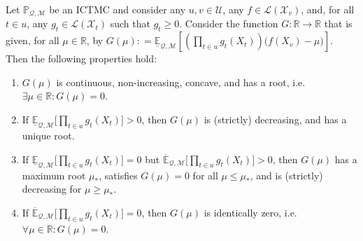 \documentclass[twoside,11pt]{article}
\makeatletter
\newcommand{\reals}{\mathbb{R}}
\newcommand{\states}{\mathcal{X}}
\newcommand{\lexp}{\underline{\mathbb{E}}_{\rateset,\mathcal{M}}}
\newcommand{\uexp}{\overline{\mathbb{E}}_{\rateset,\mathcal{M}}}
\newcommand{\gambles}{\mathcal{L}}
\newcommand{\rateset}{\mathcal{Q}}
\newcommand{\coloneqq}{:\!=}
\newcommand{\customlabel}[2]{%
   \protected@write \@auxout {}{\string \newlabel {#1}{{#2}{\thepage}{#2}{#1}{}} }%
   \hypertarget{#1}{\emph{#2}\!}
}
\makeatother
\begin{document}
\begin{proposition}\label{prop:GBR_properties}
Let $\mathbb{P}_{\rateset,\mathcal{M}}$ be an ICTMC and consider any $u,v\in\mathcal{U}$, any $f\in\gambles(\states_v)$, and, for all $t\in u$, any $g_{t}\in\gambles(\states_{t})$ such that $g_{t}\geq 0$. 
Consider the function $G: \reals\to\reals$ that is given, for all $\mu\in\reals$, by $G(\mu)\coloneqq \lexp\left[\left(\prod_{t\in u} g_{t}(X_{t})\right)\bigl(f(X_v) - \mu\bigr)\right]$.
%
%
%
Then the following properties hold: 
\begin{enumerate}[label=G\arabic*:,ref=G\arabic*]
\item $G(\mu)$ is continuous, non-increasing, concave, and has a root, i.e. $\exists \mu\in\reals:G(\mu)=0$. \label{GBR:always}
\item If $\lexp\bigl[\prod_{t\in u} g_{t}(X_{t})\bigr] >0$, then $G(\mu)$ is (strictly) decreasing, and has a unique root. \label{GBR:low_pos}
\item If $\lexp\bigl[\prod_{t\in u} g_{t}(X_{t})\bigr]=0$ but $\uexp\bigl[\prod_{t\in u} g_{t}(X_{t})\bigr] >0$, then $G(\mu)$ has a maximum root $\mu_*$, satisfies $G(\mu)=0$ for all $\mu\leq \mu_*$, and is (strictly) decreasing for $\mu\geq \mu_*$. \label{GBR:up_pos}
\item If $\uexp\bigl[\prod_{t\in u} g_{t}(X_{t})\bigr]=0$, then $G(\mu)$ is identically zero, i.e. $\forall \mu\in\reals: G(\mu)=0$. \label{GBR:none_pos}
\end{enumerate}


\end{proposition}
\end{document}
